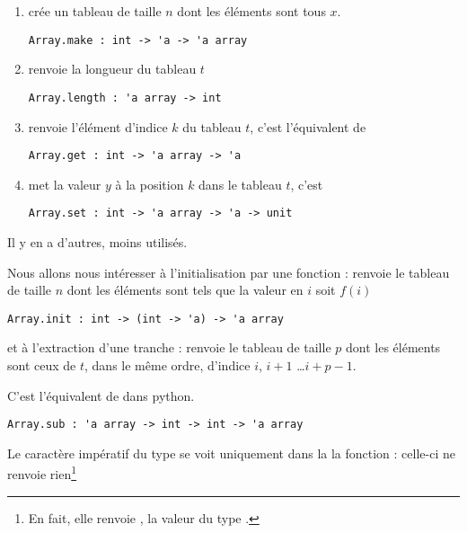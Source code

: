 \begin{enumerate}
\item {} crée un tableau de taille $n$ dont les éléments sont tous $x$.
\begin{lstlisting}
Array.make : int -> 'a -> 'a array
\end{lstlisting}

\item {} renvoie la longueur du tableau $t$
\begin{lstlisting}
Array.length : 'a array -> int
\end{lstlisting}

\item {} renvoie l'élément d'indice $k$ du tableau $t$, c'est l'équivalent de 
\begin{lstlisting}
Array.get : int -> 'a array -> 'a
\end{lstlisting}

\item {} met la valeur $y$ à la position $k$ dans le tableau $t$, c'est 
\begin{lstlisting}
Array.set : int -> 'a array -> 'a -> unit
\end{lstlisting}
\end{enumerate}

\medskip

Il y en a d'autres, moins utilisés.

Nous allons nous intéresser à l'initialisation par une fonction :
 renvoie le tableau de taille $n$ dont les éléments sont tels que la valeur en $i$ soit $f(i)$

\begin{lstlisting}
Array.init : int -> (int -> 'a) -> 'a array
\end{lstlisting}

et à l'extraction d'une tranche  : 
 renvoie le tableau de taille $p$ dont les éléments sont ceux de $t$, dans le même ordre, d'indice $i$, $i+1$ \dots $i+p-1$.

C'est l'équivalent de  dans python.
\begin{lstlisting}
Array.sub : 'a array -> int -> int -> 'a array
\end{lstlisting}


Le caractère impératif du type se voit uniquement dans la la fonction  : celle-ci ne renvoie rien\footnote{En fait, elle renvoie \type{()}, la valeur du type .}

